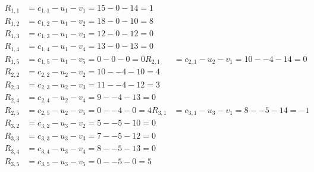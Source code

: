 \[
\begin{aligned}
R_{1,1} &= c_{1,1} - u_{1} - v_{1} = 15 - 0 - 14 = 1 \\
R_{1,2} &= c_{1,2} - u_{1} - v_{2} = 18 - 0 - 10 = 8 \\
R_{1,3} &= c_{1,3} - u_{1} - v_{3} = 12 - 0 - 12 = 0 \\
R_{1,4} &= c_{1,4} - u_{1} - v_{4} = 13 - 0 - 13 = 0 \\
R_{1,5} &= c_{1,5} - u_{1} - v_{5} = 0 - 0 - 0 = 0 
R_{2,1} &= c_{2,1} - u_{2} - v_{1} = 10 - -4 - 14 = 0 \\
R_{2,2} &= c_{2,2} - u_{2} - v_{2} = 10 - -4 - 10 = 4 \\
R_{2,3} &= c_{2,3} - u_{2} - v_{3} = 11 - -4 - 12 = 3 \\
R_{2,4} &= c_{2,4} - u_{2} - v_{4} = 9 - -4 - 13 = 0 \\
R_{2,5} &= c_{2,5} - u_{2} - v_{5} = 0 - -4 - 0 = 4 
R_{3,1} &= c_{3,1} - u_{3} - v_{1} = 8 - -5 - 14 = -1 \\
R_{3,2} &= c_{3,2} - u_{3} - v_{2} = 5 - -5 - 10 = 0 \\
R_{3,3} &= c_{3,3} - u_{3} - v_{3} = 7 - -5 - 12 = 0 \\
R_{3,4} &= c_{3,4} - u_{3} - v_{4} = 8 - -5 - 13 = 0 \\
R_{3,5} &= c_{3,5} - u_{3} - v_{5} = 0 - -5 - 0 = 5 
\end{aligned}
\]

